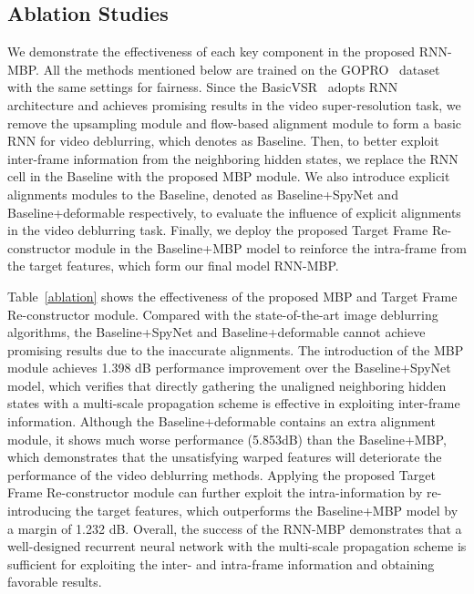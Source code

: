 \documentclass[letterpaper]{article} \usepackage{aaai22}  \usepackage{times}  \usepackage{helvet}  \usepackage{courier}  \usepackage[hyphens]{url}  \usepackage{graphicx} \urlstyle{rm} \def\UrlFont{\rm}  \usepackage{natbib}  \usepackage{caption} \DeclareCaptionStyle{ruled}{labelfont=normalfont,labelsep=colon,strut=off} \frenchspacing  \setlength{\pdfpagewidth}{8.5in}  \setlength{\pdfpageheight}{11in}  \newcommand{\hang}{\textcolor[rgb]{0.98,0.5,0.04}}
\begin{document}
\subsection{Ablation Studies}
We demonstrate the effectiveness of each key component in the proposed RNN-MBP.
All the methods mentioned below are trained on the GOPRO~\cite{deepdeblur} dataset with the same settings for fairness. 
Since the BasicVSR~\cite{chan2021basicvsr} adopts RNN architecture and achieves promising results in the video super-resolution task, we remove the upsampling module and flow-based alignment module to form a basic RNN for video deblurring, which denotes as Baseline.
Then, to better exploit inter-frame information from the neighboring hidden states, we replace the RNN cell in the Baseline with the proposed MBP module.
We also introduce explicit alignments modules to the Baseline, denoted as Baseline+SpyNet and Baseline+deformable respectively, to evaluate the influence of explicit alignments in the video deblurring task.
Finally, we deploy the proposed Target Frame Re-constructor module in the Baseline+MBP model to reinforce the intra-frame from the target features, which form our final model RNN-MBP.

Table~\ref{ablation} shows the effectiveness of the proposed MBP and Target Frame Re-constructor module.
Compared with the state-of-the-art image deblurring algorithms, the Baseline+SpyNet and Baseline+deformable cannot achieve promising results due to the inaccurate alignments.
The introduction of the MBP module achieves 1.398 dB performance improvement over the Baseline+SpyNet model, which verifies that directly gathering the unaligned neighboring hidden states with a multi-scale propagation scheme is effective in exploiting inter-frame information.
Although the Baseline+deformable contains an extra alignment module, it shows much worse performance (5.853dB) than the Baseline+MBP, which demonstrates that the unsatisfying warped features will deteriorate the performance of the video deblurring methods. 
Applying the proposed Target Frame Re-constructor module can further exploit the intra-information by re-introducing the target features, which outperforms the Baseline+MBP model by a margin of 1.232 dB.
Overall, the success of the RNN-MBP demonstrates that a well-designed recurrent neural network with the multi-scale propagation scheme is sufficient for exploiting the inter- and intra-frame information and obtaining favorable results.
\end{document}
